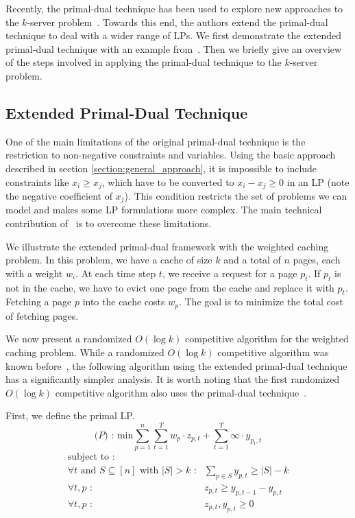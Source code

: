 Recently, the primal-dual technique has been used to explore new approaches to the $k$-server problem~\cite{bansal10:k-server}.
Towards this end, the authors extend the primal-dual technique to deal with a wider range of LPs.
We first demonstrate the extended primal-dual technique with an example from~\cite{bansal10:k-server}.
Then we briefly give an overview of the steps involved in applying the primal-dual technique to the $k$-server problem.

\subsection{Extended Primal-Dual Technique}
One of the main limitations of the original primal-dual technique is the restriction to non-negative constraints and variables.
Using the basic approach described in section \ref{section:general_approach}, it is impossible to include constraints like $x_i \geq x_j$, which have to be converted to $x_i - x_j \geq 0$ in an LP (note the negative coefficient of $x_j$).
This condition restricts the set of problems we can model and makes some LP formulations more complex.
The main technical contribution of~\cite{bansal10:k-server} is to overcome these limitations.

We illustrate the extended primal-dual framework with the weighted caching problem.
In this problem, we have a cache of size $k$ and a total of $n$ pages, each with a weight $w_i$.
At each time step $t$, we receive a request for a page $p_t$.
If $p_t$ is not in the cache, we have to evict one page from the cache and replace it with $p_t$.
Fetching a page $p$ into the cache costs $w_p$.
The goal is to minimize the total cost of fetching pages.

We now present a randomized $O(\log k)$ competitive algorithm for the weighted caching problem.
While a randomized $O(\log k)$ competitive algorithm was known before~\cite{bansal10:k-server}, the following algorithm using the extended primal-dual technique has a significantly simpler analysis.
It is worth noting that the first randomized $O(\log k)$ competitive algorithm also uses the primal-dual technique~\cite{bansal07:weighted-paging}.

First, we define the primal LP.
\[
\textrm{($P$) : min}  \sum_{p=1}^n\sum_{t=1}^T w_p \cdot z_{p,t} + \sum_{t=1}^T \infty \cdot y_{p_t,t}
\]
\[
	\begin{array}{lr}
	\textrm{subject to :} & \\
		\forall t \textrm{ and } S \subseteq [n] \textrm{ with }|S| > k \textrm{ :} & \sum_{p\in S} y_{p,t} \geq |S| - k \\
		\forall t,p \textrm{ :} & z_{p,t} \geq y_{p,t-1} - y_{p,t} \\
		\forall t,p \textrm{ :} & z_{p,t}, y_{p,t} \geq 0 \\
	\end{array}
\]

